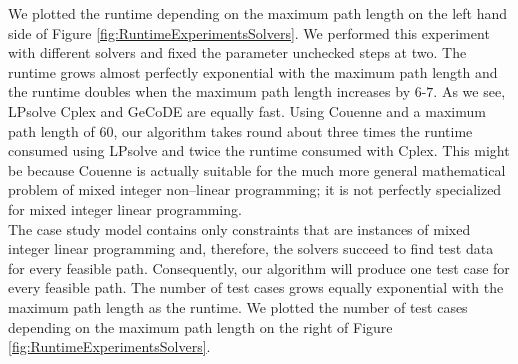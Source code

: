 \documentclass[runningheads,a4paper]{llncs}%
\begin{document}
We plotted the runtime depending on the maximum path length on the left hand side of Figure \ref{fig:RuntimeExperimentsSolvers}. We performed this experiment with different solvers and fixed the parameter unchecked steps at two. The runtime grows almost perfectly exponential with the maximum path length and the runtime doubles when the maximum path length increases by $6$-$7$. As we see, LPsolve Cplex and GeCoDE are equally fast. Using Couenne and a maximum path length of 60, our algorithm takes round about three times the runtime consumed using LPsolve and twice the runtime consumed with Cplex. This might be because Couenne is actually suitable for the much more general mathematical problem of mixed integer non--linear programming; it is not perfectly specialized for mixed integer linear programming.\\
The case study model contains only constraints that are instances of mixed integer linear programming and, therefore, the solvers succeed to find test data for every feasible path. Consequently, our algorithm will produce one test case for every feasible path. The number of test cases grows equally exponential with the maximum path length as the runtime. We plotted the number of test cases depending on the maximum path length on the right of Figure \ref{fig:RuntimeExperimentsSolvers}.
\end{document}
